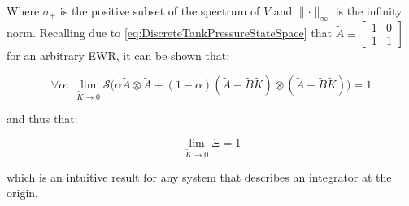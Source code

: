 Where $\sigma_+$ is the positive subset of the spectrum of $V$ and $\lVert \cdot \rVert_\infty$ is the infinity norm. Recalling due to \cref{eq:DiscreteTankPressureStateSpace} that $\tilde{A} \equiv \begin{bmatrix} 1 & 0 \\ 1 & 1 \end{bmatrix}$ for an arbitrary EWR, it can be shown that:

\begin{equation}\label{eq:AsymptoticPacketLossTolerance}
	\forall \alpha: \ \lim_{\tilde{K} \to 0} \mathcal{S}\Big(\alpha \tilde{A} \otimes \tilde{A} + (1-\alpha)(\tilde{A}-\tilde{B}\tilde{K}) \otimes (\tilde{A}-\tilde{B}\tilde{K}) \Big) = 1
\end{equation}

and thus that:

\begin{equation}\label{eq:AsymptoticXiBound}
	 \lim_{\tilde{K} \to 0} \Xi = 1
\end{equation}

which is an intuitive result for any system that describes an integrator at the origin.


